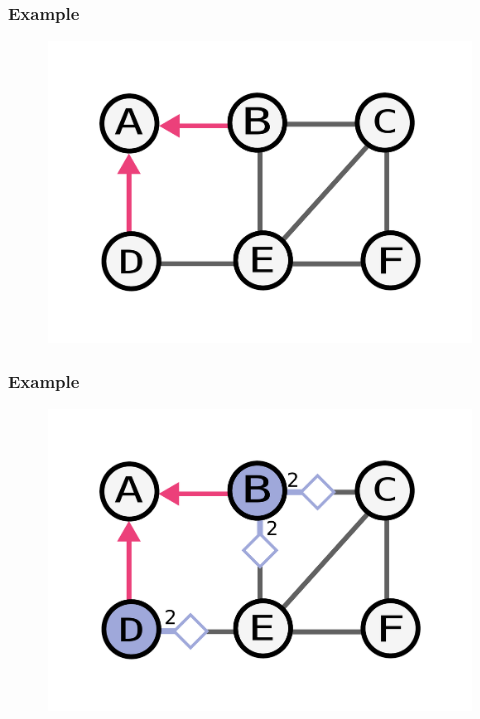 \documentclass{beamer}
\begin{document}
\begin{frame}
    \frametitle{Example}
    \begin{figure}
    \includegraphics[width=0.5\paperwidth]{round1-end.pdf}
    \end{figure}
\end{frame}


\begin{frame}
    \frametitle{Example}
    \begin{figure}
    \includegraphics[width=0.5\paperwidth]{round2.pdf}
    \end{figure}
\end{frame}
\end{document}
